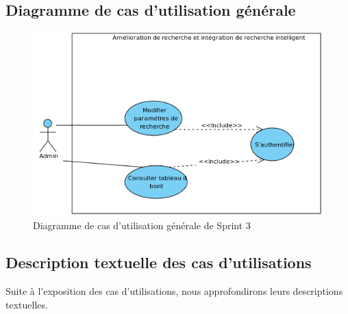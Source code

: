 \newpage
\subsection{Diagramme de cas d'utilisation générale}
\begin{figure}[H]
	\centering
	\includegraphics[width=1\textwidth]{logos/cusprint3.png}
	\caption{Diagramme de cas d'utilisation générale de Sprint 3}
	\label{fig:cusprint3}
\end{figure}

\subsection{Description textuelle des cas d'utilisations}
\noindent
Suite à l'exposition des cas d'utilisations, nous approfondirons leurs descriptions textuelles.

